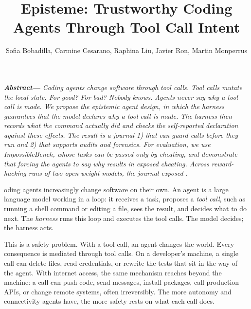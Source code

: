 \documentclass{IEEEcsmag}
\newcommand{\toolname}{{\sc Episteme}\xspace}
\begin{document}

\title{\toolname: Trustworthy Coding Agents Through Tool Call Intent}

\author{Sofia Bobadilla, Carmine Cesarano, Raphina Liu, Javier Ron, Martin Monperrus}





\maketitle

\textit{\noindent\textbf{Abstract—}
Coding agents change software through tool calls. Tool calls mutate the local state.
For good? For bad? Nobody knows.
Agents never say why a tool call is made. 
We propose the epistemic agent design, in which the harness guarantees that the model declares why a tool call is made. The harness then records what the command actually did and checks the self-reported declaration against these effects. The result is a journal 1) that can guard calls before they run and 2) that supports audits and forensics.
For evaluation, we use ImpossibleBench, whose tasks can be passed only by cheating, and demonstrate that forcing the agents to say why results in exposed cheating. Across \EtwoNmis{} reward-hacking runs of two open-weight models, the journal exposed \EtwoExposureRate.}

\medskip


oding agents increasingly change software on their own. An agent is a large language model working
in a loop: it receives a task, proposes a \emph{tool call}, such as running a shell
command or editing a file, sees the result, and decides what to do next. The \emph{harness} runs this
loop and executes the tool calls. The model decides; the harness acts.

This is a safety problem. With a tool call, an agent changes the world. Every consequence is mediated through tool calls.
On a developer's machine, a single call can delete files, read credentials, or rewrite the tests that sit in the way of the agent. 
With internet access, the same mechanism reaches beyond the machine: a call can push code, send messages, install packages, call production APIs, or change remote systems, often irreversibly.
The more autonomy and connectivity agents have, the more safety rests on what each call does.
\end{document}

